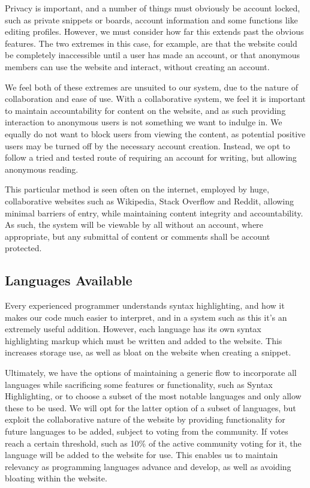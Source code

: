 Privacy is important, and a number of things must obviously be account locked, such as private snippets or boards, account information and some functions like editing profiles. 
However, we must consider how far this extends past the obvious features. 
The two extremes in this case, for example, are that the website could be completely inaccessible until a user has made an account, or that anonymous members can use the website and interact, without creating an account.

We feel both of these extremes are unsuited to our system, due to the nature of collaboration and ease of use. 
With a collaborative system, we feel it is important to maintain accountability for content on the website, and as such providing interaction to anonymous users is not something we want to indulge in. 
We equally do not want to block users from viewing the content, as potential positive users may be turned off by the necessary account creation. 
Instead, we opt to follow a tried and tested route of requiring an account for writing, but allowing anonymous reading.

This particular method is seen often on the internet, employed by huge, collaborative websites such as Wikipedia, Stack Overflow and Reddit, allowing minimal barriers of entry, while maintaining content integrity and accountability. 
As such, the system will be viewable by all without an account, where appropriate, but any submittal of content or comments shall be account protected.

\subsection{Languages Available}

Every experienced programmer understands syntax highlighting, and how it makes our code much easier to interpret, and in a system such as this it's an extremely useful addition. 
However, each language has its own syntax highlighting markup which must be written and added to the website. This increases storage use, as well as bloat on the website when creating a snippet.

Ultimately, we have the options of maintaining a generic flow to incorporate all languages while sacrificing some features or functionality, such as Syntax Highlighting, or to choose a subset of the most notable languages and only allow these to be used. 
We will opt for the latter option of a subset of languages, but exploit the collaborative nature of the website by providing functionality for future languages to be added, subject to voting from the community.
If votes reach a certain threshold, such as 10\% of the active community voting for it, the language will be added to the website for use.
This enables us to maintain relevancy as programming languages advance and develop, as well as avoiding bloating within the website.

